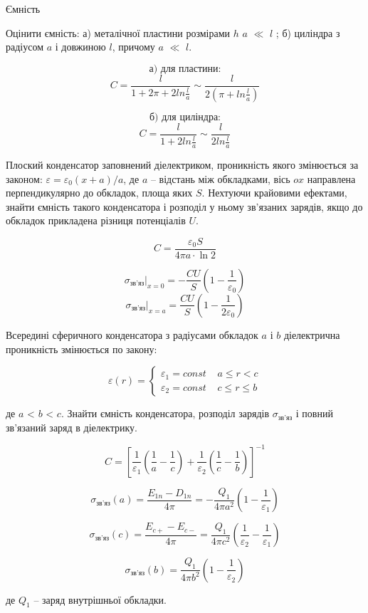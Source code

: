 \documentclass[]{ProblemBook}
\begin{document}
Ємність

\begin{problem}
Оцінити ємність: а) металічної пластини розмірами $h$ \ll $a$  $\ll$  $l$ ;  б) циліндра з радіусом $a$ і довжиною $l$, причому $a$ $\ll$  $l$.     
	\begin{solution}
\[\text{а) для пластини:}\]
\[C=\frac{l}{1+2\pi+2ln\frac{l}{a}}\sim\frac{l}{2\left(\pi+ln\frac{l}{a}\right)}\]

\[\text{б) для циліндра:}\]
\[C=\frac{l}{1+2ln\frac{l}{a}}\sim\frac{l}{2ln\frac{l}{a}}\]
\end{solution}
\end{problem}

\begin{problem}
    Плоский конденсатор заповнений діелектриком, проникність якого змінюється за законом: $\varepsilon=\varepsilon_{0}(x+a)/a$, де $a$ – відстань між обкладками, вісь $ox$ направлена перпендикулярно до обкладок, площа яких $S$. Нехтуючи крайовими ефектами, знайти ємність такого конденсатора і розподіл у ньому зв’язаних зарядів, якщо до обкладок прикладена різниця потенціалів $U$.	
	\begin{solution}
	\[C=\frac{\varepsilon_{0}S}{4\pi{a}\cdot\ln2}\] 

\[\left. \sigma_{\text{зв'яз}}  \right|_{x = 0}=-\frac{CU}{S}\left(1-\frac{1}{\varepsilon_{0}}\right)\]
\[\left. \sigma_{\text{зв'яз}}  \right|_{x = a}=\frac{CU}{S}\left(1-\frac{1}{2\varepsilon_{0}}\right)\]

\end{solution}
\end{problem}


\begin{problem}
   Всередині сферичного конденсатора з радіусами обкладок $a$ і $b$ діелектрична проникність змінюється по закону: 

\[\varepsilon (r) = \left\{ {\begin{array}{*{20}{c}}
{\varepsilon _1 = const\;\;\;\;a \le r < c}\\
{\varepsilon _2 = const\;\;\;\;c \le r \le b}
\end{array}} \right.\]

де $a$ < $b$ < $c$. Знайти ємність конденсатора, розподіл зарядів $\sigma_{\text{зв’яз}}$ і повний зв’язаний заряд в діелектрику.

	\begin{solution}
    \[C = {\left[ {\frac{1}{\varepsilon _1}\left( {\frac{1}{a} - \frac{1}{c}} \right) + \frac{1}{\varepsilon _2}\left( {\frac{1}{c} - \frac{1}{b}} \right)} \right]^{ - 1}}\]

    \[\sigma_{\text{зв’яз}}(a) =\frac{E_{1n}-D_{1n}}{4\pi} =-\frac{Q_{1}}{4\pi a^2}\left( 1 - \frac{1}{\varepsilon _1} \right)\]

\[\sigma_{\text{зв’яз}}(c)=\frac{E_{c+}-E_{c-}}{4\pi}=\frac{Q_1}{4\pi c^2}\left(\frac{1}{\varepsilon_2}-\frac{1}{\varepsilon_1}\right)\]

\[\sigma_{\text{зв’яз}}(b) =\frac{Q_1}{4\pi b^2}\left(1-\frac{1}{\varepsilon_2}\right)\]

де $Q_{1}$ – заряд внутрішньої обкладки.
\end{solution}
\end{problem}
\end{document}
